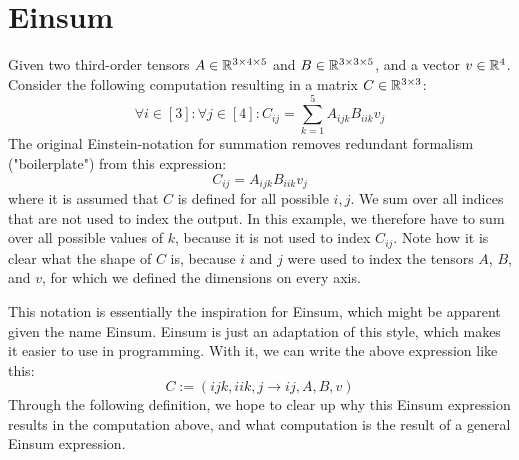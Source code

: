 \chapter{Einsum}
\label{chap:einsum}

Given two third-order tensors $A \in \mathbb{R}^{3 \times 4 \times 5}$ and $B \in \mathbb{R}^{3 \times 3 \times 5}$, and a vector $v \in \mathbb{R}^4$.
Consider the following computation resulting in a matrix $C \in \mathbb{R}^{3 \times 3}$:
$$\forall i \in [3]: \forall j \in [4]: C_{ij} = \sum\limits_{k = 1}^{5} A_{ijk} B_{iik} v_j$$
The original Einstein-notation for summation removes redundant formalism ("boilerplate") from this expression:
$$C_{ij} = A_{ijk} B_{iik} v_j$$
where it is assumed that $C$ is defined for all possible $i,j$.
We sum over all indices that are not used to index the output.
In this example, we therefore have to sum over all possible values of $k$, because it is not used to index $C_{ij}$.
Note how it is clear what the shape of $C$ is, because $i$ and $j$ were used to index the tensors $A$, $B$, and $v$,
for which we defined the dimensions on every axis.

This notation is essentially the inspiration for Einsum, which might be apparent given the name Einsum.
Einsum is just an adaptation of this style, which makes it easier to use in programming.
With it, we can write the above expression like this:
$$C := (ijk, iik, j \rightarrow ij, A, B, v)$$
Through the following definition, we hope to clear up why this Einsum expression results in the computation above,
and what computation is the result of a general Einsum expression.

